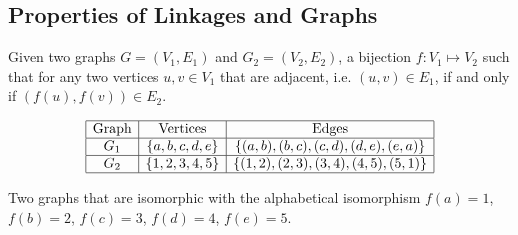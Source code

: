 \subsection{Properties of Linkages and Graphs}
Given two graphs $G=(V_1,E_1)$ and $G_2 = (V_2,E_2) $, a bijection $f: V_1 \mapsto 
V_2$ 
such that for any two vertices $u,v \in V_1$ that are adjacent, i.e. $(u, v) \in E_1$, if and only 
if $(f(u),f(v)) \in E_2$. 
\begin{table}[!ht]
\begin{center}
$$\begin{array}{|c|c|c|}\hline
\text{Graph}&\text{Vertices}&\text{Edges}\\\hline
G_1&\left\lbrace a,b,c,d,e \right\rbrace & \left\lbrace (a,b),(b,c),(c,d),(d,e),(e,a) \right\rbrace 
\\\hline
G_2&\left\lbrace 1,2,3,4,5 \right\rbrace & \left\lbrace (1,2),(2,3),(3,4),(4,5),(5,1) \right\rbrace 
\\\hline
\end{array} $$
\caption{Two graphs that are isomorphic with the alphabetical isomorphism $f(a)=1$, $f(b)=2$, $f(c) 
= 3$, $f(d)=4$, $f(e)=5$.}
\end{center} 
\label{table:linkages-1}
\end{table} 
